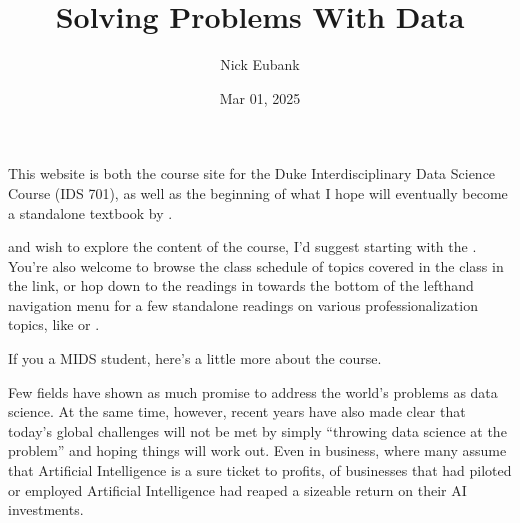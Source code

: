 \documentclass[letterpaper,10pt,english]{jupyterBook}
\title{Solving Problems With Data}
\date{Mar 01, 2025}
\author{Nick Eubank}
\begin{document}
\pagestyle{empty}
\sphinxmaketitle
\pagestyle{plain}
\sphinxtableofcontents
\pagestyle{normal}
\label{\detokenize{landing_page::doc}}


\sphinxAtStartPar
This website is both the course site for the Duke Interdisciplinary Data Science Course  (IDS 701), as well as the beginning of what I hope will eventually become a stand\sphinxhyphen{}alone textbook by .

\sphinxAtStartPar
{} and wish to explore the content of the course, I’d suggest starting with the {\hyperref[\detokenize{10_introduction/10_solving_problems_with_data::doc}]{}}. You’re also welcome to browse the class schedule of topics covered in the class in the {\hyperref[\detokenize{00_class_schedule/class_schedule::doc}]{}} link, or hop down to the readings in  towards the bottom of the left\sphinxhyphen{}hand navigation menu for a few stand\sphinxhyphen{}alone readings on various professionalization topics, like {\hyperref[\detokenize{40_in_practice/25_writing_to_stakeholders::doc}]{}} or {\hyperref[\detokenize{40_in_practice/30_giving_feedback::doc}]{}}.

\sphinxAtStartPar
If you  a MIDS student, here’s a little more about the course.

\begin{DUlineblock}{0em}
\item[] 
\end{DUlineblock}

\sphinxAtStartPar
Few fields have shown as much promise to address the world’s problems as data science. At the same time, however, recent years have also made clear that today’s global challenges will not be met by simply “throwing data science at the problem” and hoping things will work out. Even in business, where many assume that Artificial Intelligence is a sure ticket to profits,  of businesses that had piloted or employed Artificial Intelligence had reaped a sizeable return on their AI investments.
\end{document}
